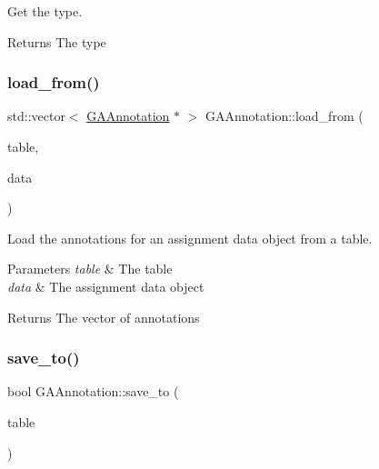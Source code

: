 Get the type. 

\begin{DoxyReturn}{Returns}
The type 
\end{DoxyReturn}
\mbox{\label{class_g_a_annotation_acbf5c9a4f95f75d7a7cf7cc6f43e00b5}} 
\subsubsection{\texorpdfstring{load\+\_\+from()}{load\_from()}}
{\footnotesize\ttfamily std\+::vector$<$ \hyperlink{class_g_a_annotation}{G\+A\+Annotation} $\ast$ $>$ G\+A\+Annotation\+::load\+\_\+from (\begin{DoxyParamCaption}\item[{\hyperlink{class_database_table}{Database\+Table} $\ast$}]{table,  }\item[{\hyperlink{class_g_a_assignment_data}{G\+A\+Assignment\+Data} $\ast$}]{data }\end{DoxyParamCaption})\hspace{0.3cm}{\ttfamily [static]}}



Load the annotations for an assignment data object from a table. 


\begin{DoxyParams}{Parameters}
{\em table} & The table \\
\hline
{\em data} & The assignment data object \\
\hline
\end{DoxyParams}
\begin{DoxyReturn}{Returns}
The vector of annotations 
\end{DoxyReturn}
\mbox{\label{class_g_a_annotation_ad836d6b85aa860864ccc2e8afefd78cd}} 
\subsubsection{\texorpdfstring{save\+\_\+to()}{save\_to()}}
{\footnotesize\ttfamily bool G\+A\+Annotation\+::save\+\_\+to (\begin{DoxyParamCaption}\item[{\hyperlink{class_database_table}{Database\+Table} $\ast$}]{table }\end{DoxyParamCaption})}



